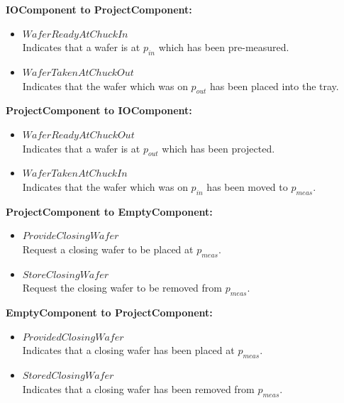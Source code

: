 \textbf{IOComponent to ProjectComponent:}
\begin{itemize}
    \item $\mathit{WaferReadyAtChuckIn}$\\
    Indicates that a wafer is at $p_\mathit{in}$ which has been pre-measured.
    \item $\mathit{WaferTakenAtChuckOut}$\\
    Indicates that the wafer which was on $p_\mathit{out}$ has been placed into the tray.
\end{itemize}

\textbf{ProjectComponent to IOComponent:}
\begin{itemize}
    \item $\mathit{WaferReadyAtChuckOut}$\\
    Indicates that a wafer is at $p_\mathit{out}$ which has been projected.
    \item $\mathit{WaferTakenAtChuckIn}$\\
    Indicates that the wafer which was on $p_\mathit{in}$ has been moved to $p_\mathit{meas}$.
\end{itemize}

\textbf{ProjectComponent to EmptyComponent:}
\begin{itemize}
    \item $\mathit{ProvideClosingWafer}$\\
    Request a closing wafer to be placed at $p_\mathit{meas}$.
    \item $\mathit{StoreClosingWafer}$\\
    Request the closing wafer to be removed from $p_\mathit{meas}$.
\end{itemize}

\textbf{EmptyComponent to ProjectComponent:}
\begin{itemize}
    \item $\mathit{ProvidedClosingWafer}$\\
    Indicates that a closing wafer has been placed at $p_\mathit{meas}$.
    \item $\mathit{StoredClosingWafer}$\\
    Indicates that a closing wafer has been removed from $p_\mathit{meas}$.
\end{itemize}
